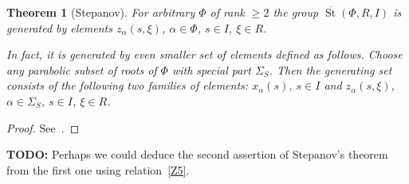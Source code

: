 \documentclass[oneside, 8pt]{amsart}
\newtheorem{theorem}{Theorem}
\newtheorem{lemma}{Lemma}
\theoremstyle{remark}
\theoremstyle{definition}
\DeclareMathOperator{\St}{St}
\numberwithin{equation}{section}
\begin{document}
\begin{comment}
For a subset of roots $S \subseteq \Phi$ denote by $\mathcal{Z}(S, R, I)$ the subset of $\overline{\St}(\Phi, R, I)$ consisting of the following two families of elements:
\begin{itemize}
 \item $x_\alpha(s)$, $\alpha \in \Phi$, $s\in I$;
 \item $z_\alpha(s, \xi)$, $\alpha \in S$, $s\in I$, $\xi \in R$.
\end{itemize}

\begin{lemma} \label{weak-Stepanov} For any $\Phi$ of rank $\geq 2$ the set $\mathcal{Z}(\Phi, R, I)$ generates $\overline{\St}(\Phi, R, I)$ as a group.
 Further, if $\Phi$ is simply laced $\overline{\St}(\Phi, R, I)$ is generated by even smaller set $\mathcal{Z}(\Phi\setminus\{\alpha, \beta\}, R, I)$, 
  where $\alpha, \beta \in \Phi$ are arbitrary roots of $\Phi$. \end{lemma}
\begin{proof}
 The first assertion is well-known, see the first part of~\cite[Lemma~4]{S15}.
 Notice that it follows from relation~\eqref{Z5} that $\mathcal{Z}(S, R, I)$ generates the same group as $\mathcal{Z}(S \cup (S - S), R, I)$.
 The second assertion then follows from the first one and the fact that for $S := \Phi \setminus \{ \alpha, \beta \}$ one has $S \cup (S - S) = \Phi$.
\end{proof}
{\bf TODO:} Probably, in the same fashion we could reprove Stepanov's theorem in the simply laced case.
\end{comment}

\begin{theorem}[Stepanov] \label{thm:Stepanov} For arbitrary $\Phi$ of rank $\geq 2$ the group $\overline{\St}(\Phi, R, I)$ is generated 
by elements $z_\alpha(s, \xi)$, $\alpha \in \Phi$, $s \in I$, $\xi \in R$.

In fact, it is generated by even smaller set of elements defined as follows.
Choose any parabolic subset of roots of $\Phi$ with special part $\Sigma_S$. Then the generating set consists of the following two families of elements:
$x_\alpha(s)$, $s \in I$ and $z_\alpha(s, \xi)$, $\alpha \in \Sigma_S$, $s \in I$, $\xi \in R$. \end{theorem}
\begin{proof} See~\cite[Lemma~4]{S15}. \end{proof}

{\bf TODO:} Perhaps we could deduce the second assertion of Stepanov's theorem from the first one using relation~\eqref{Z5}.
\end{document}
